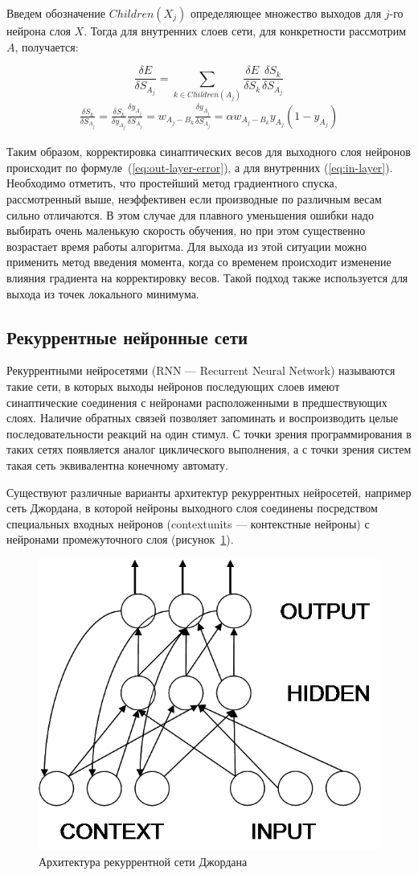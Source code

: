 \documentclass[a4paper,14pt]{extarticle} %
\begin{document}
Введем обозначение $Children(X_j)$ определяющее множество выходов для $j$-го нейрона слоя $X$. Тогда для внутренних слоев сети, для конкретности рассмотрим $A$, получается:

$$
\frac{\delta E}{\delta S_{A_j}} = \sum_{k \in Children(A_j)} \frac{\delta E}{\delta S_k} \frac{\delta S_k}{\delta S_{A_j}} 
$$
\begin{eqnarray}\label{eq:in-layer}
\frac{\delta S_k}{\delta S_{A_j}}=\frac{\delta S_k}{\delta y_{A_j}} \frac{\delta y_{A_j}}{\delta S_{A_j}}=w_{A_j-B_k}\frac{\delta y_{A_j}}{\delta S_{A_j}}=\alpha w_{A_j-B_k} y_{A_j}(1-y_{A_j})
\end{eqnarray}

Таким образом, корректировка синаптических весов для выходного слоя нейронов происходит по формуле~(\ref{eq:out-layer-error}), а для внутренних (\ref{eq:in-layer}). Необходимо отметить, что простейший метод градиентного спуска, рассмотренный выше, неэффективен если производные по различным весам сильно отличаются. В этом случае для плавного уменьшения ошибки надо выбирать очень маленькую скорость обучения, но при этом существенно возрастает время работы алгоритма. Для выхода из этой ситуации можно применить метод введения момента, когда со временем происходит изменение влияния градиента на корректировку весов. Такой подход также используется для выхода из точек локального минимума.

\subsection{Рекуррентные нейронные сети}
\hspace{\parindent} Рекуррентными нейросетями (RNN --- Recurrent Neural Network) называются такие сети, в которых выходы нейронов последующих слоев имеют синаптические соединения с нейронами расположенными в предшествующих слоях. Наличие обратных связей позволяет запоминать и воспроизводить целые последовательности реакций на один стимул. С точки зрения программирования в таких сетях появляется аналог циклического выполнения, а с точки зрения систем такая сеть эквивалентна конечному автомату. 

Существуют различные варианты архитектур рекуррентных нейросетей, например сеть Джордана, в которой нейроны выходного слоя соединены посредством специальных входных нейронов (contextunits --- контекстные нейроны) с нейронами промежуточного слоя (рисунок~\ref{fig:context-neurons}). 

\begin{figure}[h]
\centering
\includegraphics[width=0.4\linewidth]{context-neurons}
\caption{Архитектура рекуррентной сети Джордана}
\label{fig:context-neurons}
\end{figure}
\end{document}
